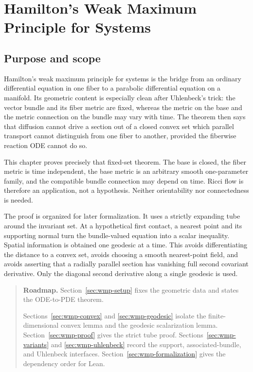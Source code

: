 \documentclass[10pt]{coll-l}
\newenvironment{roadmap}[1]{%
  \begin{quote}\small\noindent\textbf{Roadmap.} #1\par\medskip\noindent
}{\end{quote}}
\theoremstyle{definition}
\theoremstyle{remark}
\numberwithin{section}{chapter}
\numberwithin{equation}{chapter}
\begin{document}
\chapter{Hamilton's Weak Maximum Principle for Systems}
\label{ch:weak-maximum-principle-systems}

\section{Purpose and scope}

Hamilton's weak maximum principle for systems is the bridge from an
ordinary differential equation in one fiber to a parabolic differential
equation on a manifold.  Its geometric content is especially clean after
Uhlenbeck's trick: the vector bundle and its fiber metric are fixed, whereas
the metric on the base and the metric connection on the bundle may vary with
time.  The theorem then says that diffusion cannot drive a section out of a
closed convex set which parallel transport cannot distinguish from one fiber
to another, provided the fiberwise reaction ODE cannot do so.

This chapter proves precisely that fixed-set theorem.  The base is closed,
the fiber metric is time independent, the base metric is an arbitrary smooth
one-parameter family, and the compatible bundle connection may depend on
time.  Ricci flow is therefore an application, not a hypothesis.  Neither
orientability nor connectedness is needed.

The proof is organized for later formalization.  It uses a strictly expanding
tube around the invariant set.  At a hypothetical first contact, a nearest
point and its supporting normal turn the bundle-valued equation into a scalar
inequality.  Spatial information is obtained one geodesic at a time.  This
avoids differentiating the distance to a convex set, avoids choosing a smooth
nearest-point field, and avoids asserting that a radially parallel section
has vanishing full second covariant derivative.  Only the diagonal second
derivative along a single geodesic is used.

\begin{roadmap}{Section~\ref{sec:wmp-setup} fixes the geometric data and
states the ODE-to-PDE theorem.}
Sections~\ref{sec:wmp-convex} and
\ref{sec:wmp-geodesic} isolate the finite-dimensional convex lemma and the
geodesic scalarization lemma.  Section~\ref{sec:wmp-proof} gives the strict
tube proof.  Sections~\ref{sec:wmp-variants} and
\ref{sec:wmp-uhlenbeck} record the support, associated-bundle, and Uhlenbeck
interfaces.  Section~\ref{sec:wmp-formalization} gives the dependency order
for Lean.
\end{roadmap}
\end{document}
